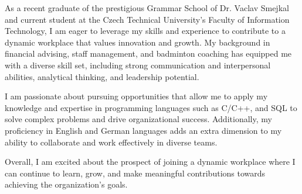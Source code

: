\documentclass[9pt]{developercv} %
\begin{document}
\vspace{0.5cm}



\begin{minipage}[t]{1\textwidth} %
	\vspace{-\baselineskip} %
	
	As a recent graduate of the prestigious Grammar School of Dr. Vaclav Smejkal and current student at the Czech Technical University's Faculty of Information Technology, 
	I am eager to leverage my skills and experience to contribute to a dynamic workplace that values innovation and growth. My background in financial advising, staff management,
	 and badminton coaching has equipped me with a diverse skill set, including strong communication and interpersonal abilities, analytical thinking, and leadership potential.

	I am passionate about pursuing opportunities that allow me to apply my knowledge and expertise in programming languages such as C/C++, and SQL
	 to solve complex problems and drive organizational success. Additionally, my proficiency in English and German languages adds an extra dimension to my ability to collaborate and work effectively in
	  diverse teams.

	Overall, I am excited about the prospect of joining a dynamic workplace where I can continue to learn, grow, and make meaningful contributions towards achieving the organization's goals.\\
\end{minipage}
\hfill %


\end{document}
